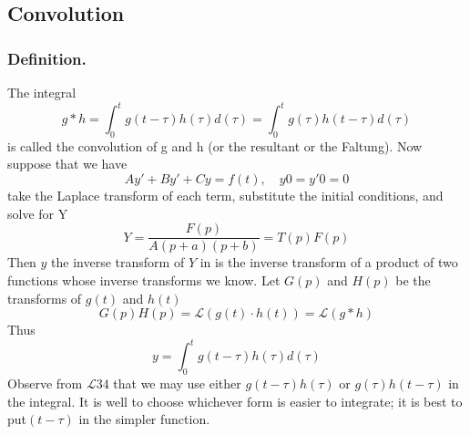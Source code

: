 \documentclass[../../../main.tex]{subfiles}
\begin{document}
\subsection{Convolution}
\subsubsection{Definition.} The integral
\begin{equation*}
    g*h=\int_{0}^{t}g(t-\tau)h(\tau)d(\tau)=\int_{0}^{t}g(\tau)h(t-\tau)d(\tau)
\end{equation*}
is called the convolution of g and h (or the resultant or the Faltung).
Now suppose that we have
\begin{equation*}
    Ay' + By' + Cy = f (t), \quad y0 = y'0 = 0
\end{equation*}
take the Laplace transform of each term, substitute the initial conditions, and solve for Y
\begin{equation*}
    Y=\frac{F(p)}{A(p + a)(p + b)}=T(p)F(p)
\end{equation*}
Then $y$ the inverse transform of $Y$ in is the inverse transform of a product of two functions whose inverse transforms we know.
Let $G(p)$ and $H(p)$ be the transforms of $g(t)$ and $h(t)$
\begin{equation*}
    G(p)H(p)=\mathcal{L}(g(t)\cdot h(t))=\mathcal{L}(g*h)
\end{equation*}
Thus
\begin{equation*}
    y=\int_{0}^{t}g(t-\tau)h(\tau)d(\tau)
\end{equation*}
Observe from $\mathcal{L}34$ that we may use either $g(t - \tau )h(\tau )$ or $g(\tau )h(t - \tau )$ in the integral.
It is well to choose whichever form is easier to integrate; it is best to put$ (t - \tau )$ in the simpler function.
\end{document}
